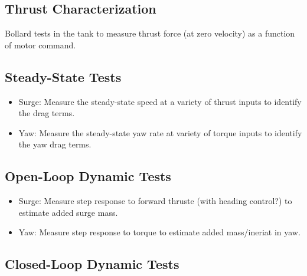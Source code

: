 \documentclass[11pt,draftcls,journal,onecolumn]{../latexlib/latex_ieee/IEEEtran}
\begin{document}
\subsection{Thrust Characterization}
Bollard tests in the tank to measure thrust force (at zero velocity) as a function of motor command.

\subsection{Steady-State Tests}
\begin{itemize}
\item Surge: Measure the steady-state speed at a variety of thrust inputs to identify the drag terms.
\item Yaw: Measure the steady-state yaw rate at variety of torque inputs to identify the yaw drag terms.
\end{itemize}


\subsection{Open-Loop Dynamic Tests}
\begin{itemize}
\item Surge: Measure step response to forward thruste (with heading control?) to estimate added surge mass.
\item Yaw: Measure step response to torque to estimate added mass/ineriat in yaw.
\end{itemize}

\subsection{Closed-Loop Dynamic Tests}




%


%


\end{document}
